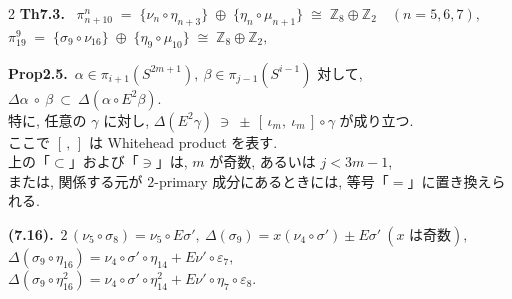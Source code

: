 \documentclass[10pt, leqno]{ltjsarticle}
\newcommand{\gen}[1]{\{#1\}}       %
\newcommand{\pit}[2]{\pi_{#1}^{#2}}
\numberwithin{equation}{section}
\theoremstyle{plain}
\theoremstyle{definition}
\theoremstyle{remark}
\begin{document}
\begin{paracol}{2}
\noindent
\textbf{Th7.3.}\
\(\pit{n+10}{n} \;=\; \gen{\nu_{n}\circ \eta_{n+3}} \;\oplus\; \gen{\eta_{n}\circ \mu_{n+1}}
  \;\cong\; \mathbb Z_{8}\oplus\mathbb Z_{2}\quad (n=5,6,7),\)\\
\(\pit{19}{9} \;=\; \gen{\sigma_{9}\circ \nu_{16}} \;\oplus\; \gen{\eta_{9}\circ \mu_{10}}
  \;\cong\; \mathbb Z_{8}\oplus\mathbb Z_{2},\)

\noindent
\textbf{Prop2.5.}\
$\alpha\in\pi_{i+1}(S^{2m+1}), \ \beta\in \pi_{j-1}(S^{i-1})$ 対して, 
\(
\Delta\alpha\ \circ\ \beta\ \subset\ \Delta(\alpha\circ E^2\beta).
\)\\
特に, 任意の $\gamma$ に対し,
\(
\Delta(E^2\gamma)\ \ni\ \pm\,[\,\iota_m,\ \iota_m\,]\circ\gamma
\)
が成り立つ. \\
ここで $[\, ,\,]$ は Whitehead product を表す. \\
上の「$\subset$」および「$\ni$」は, $m$ が奇数, 
あるいは $j<3m-1$, \\
または, 関係する元が \(2\)-primary 成分にあるときには, 
等号「$=$」に置き換えられる. 

\noindent
\textbf{(7.16).}\
\(2\,(\nu_{5}\circ\sigma_{8}) = \nu_{5}\circ E\sigma',\
\Delta(\sigma_{9}) = x(\nu_{4}\circ\sigma') \pm E\sigma'
\ (\text{$x$ は奇数}),\)\\
\(\Delta(\sigma_{9}\circ\eta_{16}) 
= \nu_{4}\circ\sigma'\circ\eta_{14} + E\nu'\circ\varepsilon_{7},\)\\
\(\Delta(\sigma_9\circ\eta_{16}^2) = \nu_4\circ\sigma'\circ\eta_{14}^2
+ E\nu'\circ\eta_7\circ\varepsilon_8. \)


\end{paracol}
\end{document}

